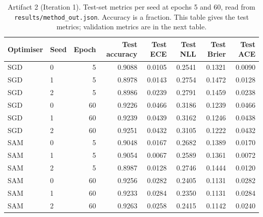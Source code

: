 \documentclass[11pt,letterpaper]{article}
\begin{document}
\begin{table}[!htbp]
\centering
\footnotesize
\caption{Artifact 2 (Iteration 1). Test-set metrics per seed at epochs 5 and 60, read from \texttt{results/method\_out.json}. Accuracy is a fraction. This table gives the test metrics; validation metrics are in the next table.}
\label{tab:perseedA}
\begin{tabular}{llrrrrrr}
\toprule
Optimiser & Seed & Epoch & Test accuracy & Test ECE & Test NLL & Test Brier & Test ACE \\
\midrule
SGD & 0 & 5 & 0.9088 & 0.0105 & 0.2541 & 0.1321 & 0.0090 \\
SGD & 1 & 5 & 0.8978 & 0.0143 & 0.2754 & 0.1472 & 0.0128 \\
SGD & 2 & 5 & 0.8986 & 0.0239 & 0.2791 & 0.1459 & 0.0238 \\
SGD & 0 & 60 & 0.9226 & 0.0466 & 0.3186 & 0.1239 & 0.0466 \\
SGD & 1 & 60 & 0.9239 & 0.0439 & 0.3162 & 0.1246 & 0.0438 \\
SGD & 2 & 60 & 0.9251 & 0.0432 & 0.3105 & 0.1222 & 0.0432 \\
SAM & 0 & 5 & 0.9048 & 0.0167 & 0.2682 & 0.1389 & 0.0170 \\
SAM & 1 & 5 & 0.9054 & 0.0067 & 0.2589 & 0.1361 & 0.0072 \\
SAM & 2 & 5 & 0.8987 & 0.0128 & 0.2746 & 0.1444 & 0.0120 \\
SAM & 0 & 60 & 0.9256 & 0.0282 & 0.2405 & 0.1131 & 0.0282 \\
SAM & 1 & 60 & 0.9233 & 0.0284 & 0.2350 & 0.1131 & 0.0284 \\
SAM & 2 & 60 & 0.9263 & 0.0258 & 0.2415 & 0.1142 & 0.0240 \\
\bottomrule
\end{tabular}
\end{table}
\end{document}
